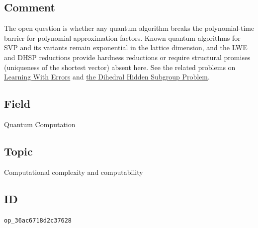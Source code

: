 \subsection*{Comment}

The open question is whether any quantum algorithm breaks the
polynomial-time barrier for polynomial approximation factors.  Known quantum
algorithms for SVP and its variants remain exponential in the lattice
dimension, and the LWE and DHSP reductions provide hardness reductions or
require structural promises (uniqueness of the shortest vector) absent here.
See the related problems on \href{https://qiqc-op.com/problem/op_3596f8c955c66d94/}{Learning With Errors} and \href{https://qiqc-op.com/problem/op_90a05e57e44c086e/}{the Dihedral Hidden Subgroup Problem}.

\subsection*{Field}

Quantum Computation

\subsection*{Topic}

Computational complexity and computability

\subsection*{ID}

\texttt{op\_36ac6718d2c37628}

